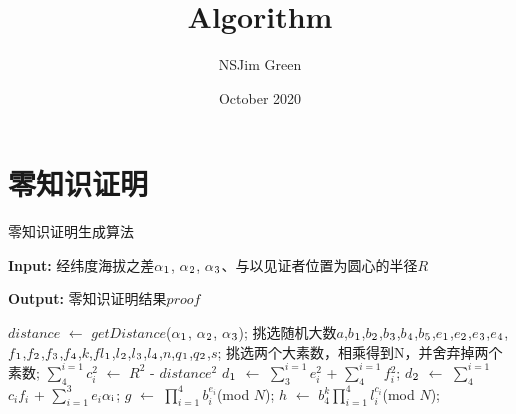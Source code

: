 \documentclass{article}
\title{Algorithm}
\author{NSJim Green}
\date{October 2020}
\begin{document}
	
	\maketitle
	
	\section{零知识证明}
	
	\begin{algorithm}
		\caption{零知识证明生成算法} %
		\label{alg1} %
		{\bf Input:} 经纬度海拔之差$\alpha$$_{\mbox{\scriptsize 1}}$, $\alpha$$_{\mbox{\scriptsize 2}}$, $\alpha$$_{\mbox{\scriptsize 3}}$、与以见证者位置为圆心的半径${R}$%
		
		{\bf Output:} 零知识证明结果${proof}$
		\begin{algorithmic}[1] %
			\STATE ${distance}$ $\gets$ ${getDistance}$($\alpha$$_{\mbox{\scriptsize 1}}$, $\alpha$$_{\mbox{\scriptsize 2}}$, $\alpha$$_{\mbox{\scriptsize 3}}$);
			\STATE 挑选随机大数${a}$,${b}$$_{\mbox{\scriptsize 1}}$,${b}$$_{\mbox{\scriptsize 2}}$,${b}$$_{\mbox{\scriptsize 3}}$,${b}$$_{\mbox{\scriptsize 4}}$,${b}$$_{\mbox{\scriptsize 5}}$,${e}$$_{\mbox{\scriptsize 1}}$,${e}$$_{\mbox{\scriptsize 2}}$,${e}$$_{\mbox{\scriptsize 3}}$,${e}$$_{\mbox{\scriptsize 4}}$,${f}$$_{\mbox{\scriptsize 1}}$,${f}$$_{\mbox{\scriptsize 2}}$,${f}$$_{\mbox{\scriptsize 3}}$,${f}$$_{\mbox{\scriptsize 4}}$,${k}$,${f
			l}$$_{\mbox{\scriptsize 1}}$,${l}$$_{\mbox{\scriptsize 2}}$,${l}$$_{\mbox{\scriptsize 3}}$,${l}$$_{\mbox{\scriptsize 4}}$,${n}$,${q}$$_{\mbox{\scriptsize 1}}$,${q}$$_{\mbox{\scriptsize 2}}$,${s}$;
			\STATE 挑选两个大素数，相乘得到N，并舍弃掉两个素数;
			\STATE $\sum_{4}^{i=1}$${c{_i^2}}$ $\gets$ ${R^{2}}$ - ${distance^{2}}$
			\STATE ${d}$$_{\mbox{\scriptsize 1}}$ $\gets$ $\sum_{3}^{i=1}$${e{_i^2}}$ + $\sum_{4}^{i=1}$${f{_i^2}}$;
			\STATE ${d}$$_{\mbox{\scriptsize 2}}$ $\gets$ $\sum_{4}^{i=1}$${c{_i}f{_i}}$ + $\sum_{i=1}^{3}$${e{_i}}$$\alpha$$_{\mbox{\scriptsize i}}$;
			\STATE ${g}$ $\gets$ $\prod_{i=1}^{4}$${b{_i^{e{_i}}}}$(mod ${N}$);
			\STATE ${h}$ $\gets$ ${b{_4^k}}$$\prod_{i=1}^{4}$${l{_i^{c{_i}}}}$(mod ${N}$);

\end{algorithmic}
\end{algorithm}
\end{document}
